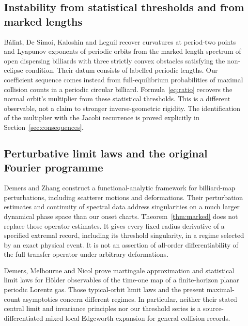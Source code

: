 \subsection{Instability from statistical thresholds and from marked lengths}
B\'alint, De Simoi, Kaloshin and Leguil \cite{BDKL} recover curvatures at
period-two points and Lyapunov exponents of periodic orbits from the marked
length spectrum of open dispersing billiards with three strictly convex
obstacles satisfying the non-eclipse condition. Their datum consists of
labelled periodic lengths. Our coefficient sequence comes instead from
full-equilibrium probabilities of maximal collision counts in a periodic
circular billiard. Formula~\eqref{eq:ratio} recovers the normal
orbit's multiplier from these statistical thresholds. This is a different
observable, not a claim to stronger inverse-geometric rigidity. The
identification of the multiplier with the Jacobi recurrence is proved
explicitly in Section~\ref{sec:consequences}.

\subsection{Perturbative limit laws and the original Fourier programme}
Demers and Zhang \cite{DemersZhang} construct a functional-analytic
framework for billiard-map perturbations, including scatterer motions and
deformations. Their perturbation estimates and continuity of spectral
data address singularities on a much larger dynamical phase space than
our onset charts. Theorem~\ref{thm:marked} does not replace those operator
estimates. It gives every fixed radius derivative of a specified extremal
record, including its threshold singularity, in a regime selected by an
exact physical event. It is not an assertion of all-order differentiability
of the full transfer operator under arbitrary deformations.

Demers, Melbourne and Nicol \cite{DMN} prove martingale approximation and
statistical limit laws for H\"older observables of the time-one map of a
finite-horizon planar periodic Lorentz gas. Those typical-orbit limit laws
and the present maximal-count asymptotics concern different regimes.
In particular, neither their stated central limit and invariance principles
nor our threshold series is a source-differentiated mixed local Edgeworth
expansion for general collision records.

